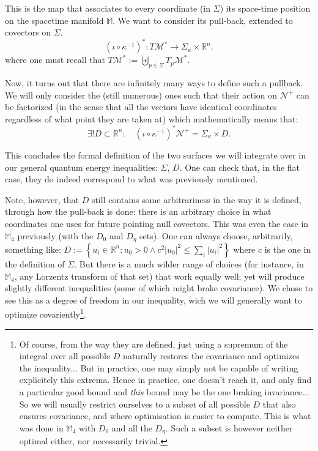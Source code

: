 \documentclass[a4paper,11pt]{article}
\numberwithin{equation}{section}
\theoremstyle{definition}
\begin{document}
This is the map that associates to every coordinate (in $\Sigma$) its space-time position on the spacetime manifold $\mathbb{M}$. We want to consider its pull-back, extended to covectors on $\Sigma$.
\begin{equation}
(\iota \circ \kappa^{-1})^*: T\mathcal{M}^* \to \Sigma_\kappa \times \mathbb{R}^n.
\end{equation}
where one must recall that $T\mathcal{M}^* := \underset{p\in \Sigma}{ \biguplus} T_p\mathcal{M}^*$.

Now, it turns out that there are infinitely many ways to define such a pullback. We will only consider the (still numerous) ones such that their action on $\mathcal{N}^+$ can be factorized (in the sense that all the vectors have identical coordinates regardless of what point they are taken at) which mathematically means that:
\begin{equation}
\exists ! D \subset \mathbb{R}^n : \quad (\iota \circ \kappa^{-1})^*\mathcal{N}^+ =  \Sigma_\kappa \times D.
\end{equation}

This concludes the formal definition of the two surfaces we will integrate over in our general quantum energy inequalities: $\Sigma$, $D$. One can check that, in the flat case, they do indeed correspond to what was previously mentioned.

Note, however, that $D$ still contains some arbitrariness in the way it is defined, through how the pull-back is done: there is an arbitrary choice in what coordinates one uses for future pointing null covectors. This was even the case in $\mathbb{M}_4$ previously (with the $D_0$ and $D_\eta$ sets). One can always choose, arbitrarily, something like:
$D:= \left\{u_i \in \mathbb{R}^n : u_0 >0 \wedge c^2 |u_0|^2 \leq \sum_i |u_i|^2 \right\}$
where $c$ is the one in the definition of $\Sigma$. But there is a much wilder range of choices (for instance, in $\mathbb{M}_4$, any Lorzentz transform of that set) that work equally well; yet will produce slightly different inequalities (some of which might brake covariance). We chose to see this as a degree of freedom in our inequality, wich we will generally want to optimize covariently\footnote{Of course, from the way they are defined, just using a supremum of the integral over all possible $D$ naturally restores the covariance and optimizes the inequality... But in practice, one may simply not be capable of writing explicitely this extrema. Hence in practice, one doesn't reach it, and only find a particular good bound and \emph{this} bound may be the one braking invariance... So we will usually restrict ourselves to a subset of all possible $D$ that also ensures covariance, and where optimisation is easier to compute. This is what was done in $\mathbb{M}_4$ with $D_0$ and all the $D_\eta$. Such a subset is however neither optimal either, nor necessarily trivial.}.
\end{document}
